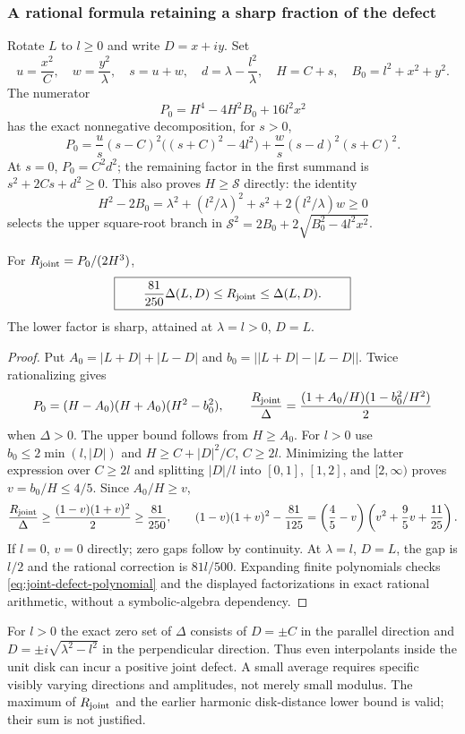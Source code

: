 \subsubsection{A rational formula retaining a sharp fraction of the defect}
Rotate $L$ to $l\ge0$ and write $D=x+iy$. Set
\[
 u=\frac{x^2}{C},\quad w=\frac{y^2}{\lambda},\quad s=u+w,
 \quad d=\lambda-\frac{l^2}{\lambda},\quad H=C+s,
 \quad B_0=l^2+x^2+y^2.
\]
The numerator
\[
 P_0=H^4-4H^2B_0+16l^2x^2
\]
has the exact nonnegative decomposition, for $s>0$,
\begin{equation}\label{eq:joint-defect-polynomial}
 P_0=\frac{u}{s}(s-C)^2\bigl((s+C)^2-4l^2\bigr)
       +\frac{w}{s}(s-d)^2(s+C)^2.
\end{equation}
At $s=0$, $P_0=C^2d^2$; the remaining factor in the first summand is
$s^2+2Cs+d^2\ge0$.
This also proves $H\ge\mathcal S$ directly: the identity
\[
 H^2-2B_0=\lambda^2+(l^2/\lambda)^2+s^2+2(l^2/\lambda)w\ge0
\]
selects the upper square-root branch in
$\mathcal S^2=2B_0+2\sqrt{B_0^2-4l^2x^2}$.
\begin{theorem}
\label{thm:rational-joint-correction}
For $R_{\rm joint}=P_0/(2H^3)$,
\[
 \boxed{\qquad
 \frac{81}{250}\Delta(L,D)\le R_{\rm joint}\le\Delta(L,D).
 \qquad}
\]
The lower factor is sharp, attained at $\lambda=l>0$, $D=L$.
\end{theorem}
\begin{proof}
Put $A_0=|L+D|+|L-D|$ and $b_0=\bigl||L+D|-|L-D|\bigr|$.
Twice rationalizing gives
\[
 P_0=(H-A_0)(H+A_0)(H^2-b_0^2),\qquad
 \frac{R_{\rm joint}}\Delta
 =\frac{(1+A_0/H)(1-b_0^2/H^2)}2
\]
when $\Delta>0$. The upper bound follows from $H\ge A_0$.
For $l>0$ use $b_0\le2\min(l,|D|)$ and
$H\ge C+|D|^2/C$, $C\ge2l$. Minimizing the latter expression over
$C\ge2l$ and splitting $|D|/l$ into $[0,1]$, $[1,2]$, and
$[2,\infty)$ proves $v=b_0/H\le4/5$.
Since $A_0/H\ge v$,
\[
 \frac{R_{\rm joint}}\Delta\ge\frac{(1-v)(1+v)^2}{2}
 \ge\frac{81}{250},\qquad
 (1-v)(1+v)^2-\frac{81}{125}
 =\left(\frac45-v\right)
 \left(v^2+\frac95v+\frac{11}{25}\right).
\]
If $l=0$, $v=0$ directly; zero gaps follow by continuity.
At $\lambda=l$, $D=L$, the gap is $l/2$ and the rational correction
is $81l/500$. Expanding finite polynomials checks
\eqref{eq:joint-defect-polynomial} and the displayed factorizations
in exact rational arithmetic, without a symbolic-algebra dependency.
\end{proof}
For $l>0$ the exact zero set of $\Delta$ consists of
$D=\pm C$ in the parallel direction and
$D=\pm i\sqrt{\lambda^2-l^2}$ in the perpendicular direction.
Thus even interpolants inside the unit disk can incur a positive joint
defect. A small average requires specific visibly varying directions and
amplitudes, not merely small modulus. The maximum of $R_{\rm joint}$
and the earlier harmonic disk-distance lower bound is valid; their sum
is not justified.

